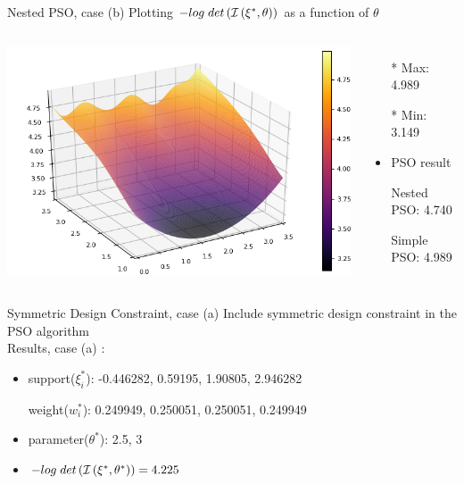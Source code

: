 \documentclass{beamer}
\begin{document}
\begin{frame}{Nested PSO, case (b)}
  Plotting $-log \hspace{1mm} det \left( \mathcal{I} \left( \xi^*,\theta \right) \right)$ as a function of $\theta$\\
  \begin{columns}
    \begin{center}
      \includegraphics[scale=0.5]{surfaceb.png}
    \end{center}
    \begin{itemize}
      \item[*] Max: 4.989
      \item[*] Min: 3.149
      \vspace{5mm}
      \item PSO result
      \item[] Nested PSO: 4.740
      \item[] Simple PSO: 4.989
    \end{itemize}
  \end{columns}
\end{frame}

\begin{frame}{Symmetric Design Constraint, case (a)}
  Include symmetric design constraint in the PSO algorithm\\
  \vspace{3mm}
  Results, case (a) :\\
  \vspace{3mm}
  \begin{itemize}
    \item {} support($\xi_i^*$): -0.446282, 0.59195, 1.90805, 2.946282
    \item[] \makebox[2cm][l]{} weight($w_i^*$): 0.249949, 0.250051, 0.250051, 0.249949
    \vspace{3mm}
    \item {} parameter($\theta^*$): 2.5, 3
    \vspace{3mm}
    \item {} $-log \hspace{1mm} det \left( \mathcal{I} \left( \xi^*,\theta^* \right) \right)=4.225$
  \end{itemize}
\end{frame}
\end{document}
